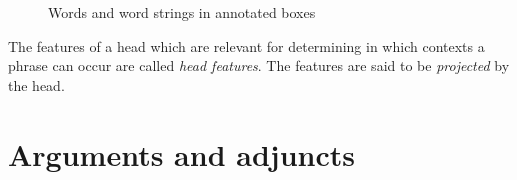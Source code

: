 \begin{figure}
\caption{\label{Abbildung-ausfuehrlich-beschriftete-Schachteln}Words and word strings in annotated boxes}
\end{figure}%

The features of a head which are relevant for determining in which contexts a phrase can occur are called \emph{head features}.
The features are said to be \emph{projected} by the head.



\section{Arguments and adjuncts}
\label{sec-intro-arg-adj}
\label{Abschnitt-Argument-Adjunkt}
\label{Abschnitt-Valenz}

